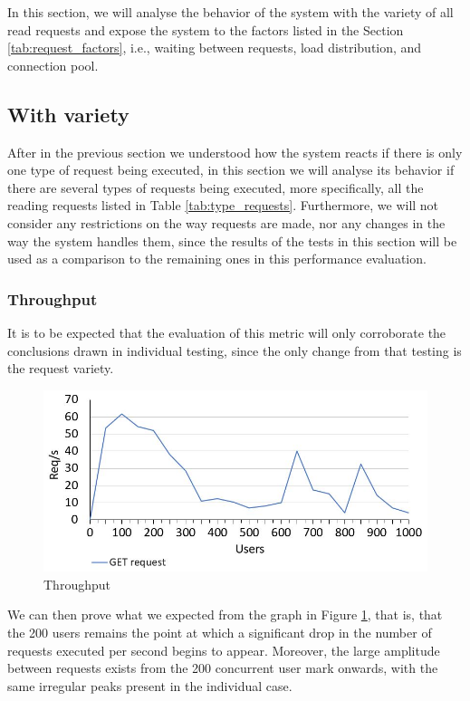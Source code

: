 In this section, we will analyse the behavior of the system with the variety of all read requests and expose the system to the factors listed in the Section \ref{tab:request_factors}, i.e., waiting between requests, load distribution, and connection pool.
  
  
  \subsection{With variety}
  
  After in the previous section we understood how the system reacts if there is only one type of request being executed, in this section we will analyse its behavior if there are several types of requests being executed, more specifically, all the reading requests listed in Table \ref{tab:type_requests}. Furthermore, we will not consider any restrictions on the way requests are made, nor any changes in the way the system handles them, since the results of the tests in this section will be used as a comparison to the remaining ones in this performance evaluation.
  
  
  \subsubsection{Throughput}
  
  It is to be expected that the evaluation of this metric will only corroborate the conclusions drawn in individual testing, since the only change from that testing is the request variety.
  
    \begin{figure}[H]
    \centering
    \includegraphics[width=.8\textwidth]{img/performance_evaluation/normal.JPG}
    \caption{\label{tab:throughput_normal}Throughput}
  \end{figure}
  
  We can then prove what we expected from the graph in Figure \ref{tab:throughput_normal}, that is, that the 200 users remains the point at which a significant drop in the number of requests executed per second begins to appear. Moreover, the large amplitude between requests exists from the 200 concurrent user mark onwards, with the same irregular peaks present in the individual case.
  
